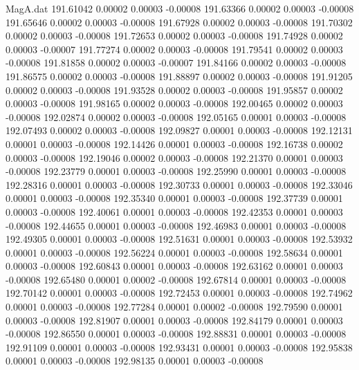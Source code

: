 \begin{filecontents}{MagA.dat}
 191.61042    0.00002    0.00003   -0.00008
 191.63366    0.00002    0.00003   -0.00008
 191.65646    0.00002    0.00003   -0.00008
 191.67928    0.00002    0.00003   -0.00008
 191.70302    0.00002    0.00003   -0.00008
 191.72653    0.00002    0.00003   -0.00008
 191.74928    0.00002    0.00003   -0.00007
 191.77274    0.00002    0.00003   -0.00008
 191.79541    0.00002    0.00003   -0.00008
 191.81858    0.00002    0.00003   -0.00007
 191.84166    0.00002    0.00003   -0.00008
 191.86575    0.00002    0.00003   -0.00008
 191.88897    0.00002    0.00003   -0.00008
 191.91205    0.00002    0.00003   -0.00008
 191.93528    0.00002    0.00003   -0.00008
 191.95857    0.00002    0.00003   -0.00008
 191.98165    0.00002    0.00003   -0.00008
 192.00465    0.00002    0.00003   -0.00008
 192.02874    0.00002    0.00003   -0.00008
 192.05165    0.00001    0.00003   -0.00008
 192.07493    0.00002    0.00003   -0.00008
 192.09827    0.00001    0.00003   -0.00008
 192.12131    0.00001    0.00003   -0.00008
 192.14426    0.00001    0.00003   -0.00008
 192.16738    0.00002    0.00003   -0.00008
 192.19046    0.00002    0.00003   -0.00008
 192.21370    0.00001    0.00003   -0.00008
 192.23779    0.00001    0.00003   -0.00008
 192.25990    0.00001    0.00003   -0.00008
 192.28316    0.00001    0.00003   -0.00008
 192.30733    0.00001    0.00003   -0.00008
 192.33046    0.00001    0.00003   -0.00008
 192.35340    0.00001    0.00003   -0.00008
 192.37739    0.00001    0.00003   -0.00008
 192.40061    0.00001    0.00003   -0.00008
 192.42353    0.00001    0.00003   -0.00008
 192.44655    0.00001    0.00003   -0.00008
 192.46983    0.00001    0.00003   -0.00008
 192.49305    0.00001    0.00003   -0.00008
 192.51631    0.00001    0.00003   -0.00008
 192.53932    0.00001    0.00003   -0.00008
 192.56224    0.00001    0.00003   -0.00008
 192.58634    0.00001    0.00003   -0.00008
 192.60843    0.00001    0.00003   -0.00008
 192.63162    0.00001    0.00003   -0.00008
 192.65480    0.00001    0.00002   -0.00008
 192.67814    0.00001    0.00003   -0.00008
 192.70142    0.00001    0.00003   -0.00008
 192.72453    0.00001    0.00003   -0.00008
 192.74962    0.00001    0.00003   -0.00008
 192.77284    0.00001    0.00002   -0.00008
 192.79590    0.00001    0.00003   -0.00008
 192.81907    0.00001    0.00003   -0.00008
 192.84179    0.00001    0.00003   -0.00008
 192.86550    0.00001    0.00003   -0.00008
 192.88831    0.00001    0.00003   -0.00008
 192.91109    0.00001    0.00003   -0.00008
 192.93431    0.00001    0.00003   -0.00008
 192.95838    0.00001    0.00003   -0.00008
 192.98135    0.00001    0.00003   -0.00008

\end{filecontents}
